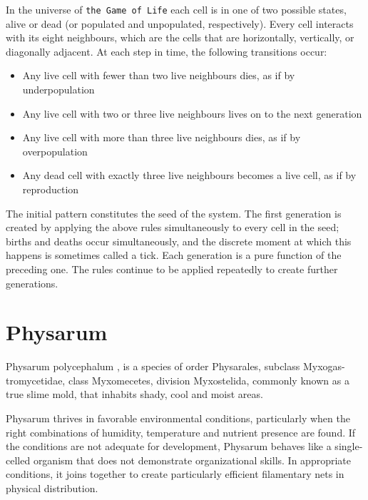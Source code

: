 In the universe of \texttt{the Game of Life} each cell is in one of two possible states, alive or dead (or populated and unpopulated, respectively). Every cell interacts with its eight neighbours, which are the cells that are horizontally, vertically, or diagonally adjacent. At each step in time, the following transitions occur:
\begin{itemize}
\item Any live cell with fewer than two live neighbours dies, as if by underpopulation
\item Any live cell with two or three live neighbours lives on to the next generation
\item Any live cell with more than three live neighbours dies, as if by overpopulation
\item Any dead cell with exactly three live neighbours becomes a live cell, as if by reproduction
\end{itemize}
\par
The initial pattern constitutes the seed of the system. The first generation is created by applying the above rules simultaneously to every cell in the seed; births and deaths occur simultaneously, and the discrete moment at which this happens is sometimes called a tick. Each generation is a pure function of the preceding one. The rules continue to be applied repeatedly to create further generations. 

\section{Physarum}

Physarum polycephalum \cite{sun2017physarum}, \cite{mayne2016biology} is a species of order Physarales, subclass Myxogas-tromycetidae, class Myxomecetes, division Myxostelida, commonly known as a true slime mold, that inhabits shady, cool and moist areas. 
\par
Physarum thrives in favorable environmental conditions, particularly when the right combinations of humidity, temperature and nutrient presence are found. If the conditions are not adequate for development, Physarum behaves like a single-celled organism that does not demonstrate organizational skills. In appropriate conditions, it joins together to create particularly efficient filamentary nets in physical distribution.

